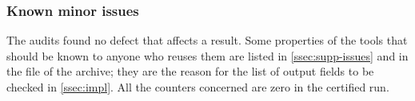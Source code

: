 \subsubsection*{Known minor issues}
The audits found no defect that affects a result. Some properties of the tools that should be known to
anyone who reuses them are listed in \cref{ssec:supp-issues} and in the file  of the
archive; they are the reason for the list of output fields to be checked in \cref{ssec:impl}. All the
counters concerned are zero in the certified run.
